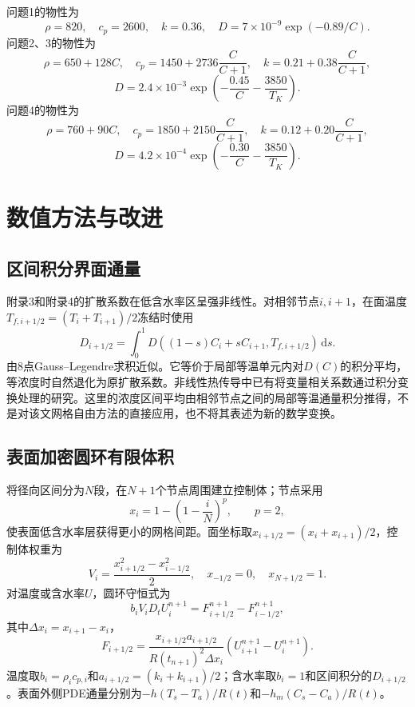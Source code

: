 \documentclass[UTF8,zihao=-4,a4paper]{ctexart}
\newcommand{\dd}{\,\mathrm d}
\begin{document}
问题1的物性为
\begin{equation}
\rho=820,\quad c_p=2600,\quad k=0.36,\quad D=7\times10^{-9}\exp(-0.89/C).
\end{equation}
问题2、3的物性为
\begin{equation}
\rho=650+128C,\quad c_p=1450+2736\frac{C}{C+1},\quad k=0.21+0.38\frac{C}{C+1},
\end{equation}
\begin{equation}
D=2.4\times10^{-3}\exp\left(-\frac{0.45}{C}-\frac{3850}{T_K}\right).
\end{equation}
问题4的物性为
\begin{equation}
\rho=760+90C,\quad c_p=1850+2150\frac{C}{C+1},\quad k=0.12+0.20\frac{C}{C+1},
\end{equation}
\begin{equation}
D=4.2\times10^{-4}\exp\left(-\frac{0.30}{C}-\frac{3850}{T_K}\right).
\end{equation}

\section{数值方法与改进}
\subsection{区间积分界面通量}
附录3和附录4的扩散系数在低含水率区呈强非线性。对相邻节点$i,i+1$，在面温度$T_{f,i+1/2}=(T_i+T_{i+1})/2$冻结时使用
\begin{equation}
D_{i+1/2}=\int_0^1D((1-s)C_i+sC_{i+1},T_{f,i+1/2})\dd s.
\end{equation}
由8点Gauss--Legendre求积近似。它等价于局部等温单元内对$D(C)$的积分平均，等浓度时自然退化为原扩散系数。非线性热传导中已有将变量相关系数通过积分变换处理的研究\cite{stevens2010}。这里的浓度区间平均由相邻节点之间的局部等温通量积分推得，不是对该文网格自由方法的直接应用，也不将其表述为新的数学变换。

\subsection{表面加密圆环有限体积}
将径向区间分为$N$段，在$N+1$个节点周围建立控制体；节点采用
\begin{equation}
x_i=1-\left(1-\frac{i}{N}\right)^p,\qquad p=2,
\end{equation}
使表面低含水率层获得更小的网格间距。面坐标取$x_{i+1/2}=(x_i+x_{i+1})/2$，控制体权重为
\begin{equation}
V_i=\frac{x_{i+1/2}^2-x_{i-1/2}^2}{2},\quad x_{-1/2}=0,\quad x_{N+1/2}=1.
\end{equation}
对温度或含水率$U$，圆环守恒式为
\begin{equation}
b_iV_i D_t U_i^{n+1}=F_{i+1/2}^{n+1}-F_{i-1/2}^{n+1},
\end{equation}
其中$\Delta x_i=x_{i+1}-x_i$，
\begin{equation}
F_{i+1/2}=\frac{x_{i+1/2}a_{i+1/2}}{R(t_{n+1})^2\Delta x_i}(U_{i+1}^{n+1}-U_i^{n+1}).
\end{equation}
温度取$b_i=\rho_ic_{p,i}$和$a_{i+1/2}=(k_i+k_{i+1})/2$；含水率取$b_i=1$和区间积分的$D_{i+1/2}$。表面外侧PDE通量分别为$-h(T_s-T_a)/R(t)$和$-h_m(C_s-C_a)/R(t)$。
\end{document}
